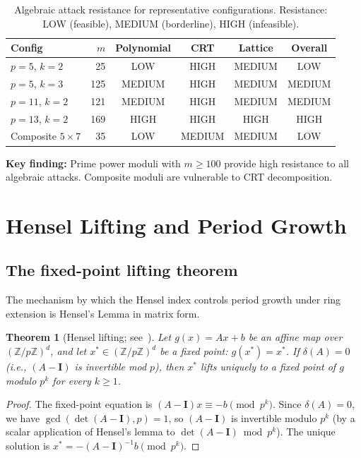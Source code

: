 \documentclass[11pt]{article}
\theoremstyle{plain}
\newtheorem{theorem}{Theorem}[section]
\theoremstyle{definition}
\newcommand{\Z}{\mathbb{Z}}
\newcommand{\Id}{\mathbf{I}}
\begin{document}
\begin{table}[ht]
\centering
\caption{Algebraic attack resistance for representative configurations. Resistance: LOW (feasible), MEDIUM (borderline), HIGH (infeasible).}
\label{tab:algebraic}
\medskip
\begin{tabular}{@{}lrcccc@{}}
\toprule
Config & $m$ & Polynomial & CRT & Lattice & Overall\\
\midrule
$p=5$, $k=2$ & 25 & LOW & HIGH & MEDIUM & LOW\\
$p=5$, $k=3$ & 125 & MEDIUM & HIGH & MEDIUM & MEDIUM\\
$p=11$, $k=2$ & 121 & MEDIUM & HIGH & MEDIUM & MEDIUM\\
$p=13$, $k=2$ & 169 & HIGH & HIGH & HIGH & HIGH\\
Composite $5 \times 7$ & 35 & LOW & MEDIUM & MEDIUM & LOW\\
\bottomrule
\end{tabular}
\end{table}

\textbf{Key finding:} Prime power moduli with $m \geq 100$ provide high resistance to all algebraic attacks. Composite moduli are vulnerable to CRT decomposition.

\section{Hensel Lifting and Period Growth}
\label{sec:hensel}

\subsection{The fixed-point lifting theorem}

The mechanism by which the Hensel index controls period growth under ring extension is Hensel's Lemma in matrix form.

\begin{theorem}[Hensel lifting; see~\citealt{Gouvea1997}]
\label{thm:hensel}
Let $g(x) = Ax + b$ be an affine map over $(\Z/p\Z)^d$, and let $x^* \in (\Z/p\Z)^d$ be a fixed point: $g(x^*) = x^*$. If $\delta(A) = 0$ (i.e., $(A-\Id)$ is invertible mod $p$), then $x^*$ lifts uniquely to a fixed point of $g$ modulo $p^k$ for every $k \geq 1$.
\end{theorem}

\begin{proof}[Proof]
The fixed-point equation is $(A-\Id)x \equiv -b \pmod{p^k}$. Since $\delta(A)=0$, we have $\gcd(\det(A-\Id),p)=1$, so $(A-\Id)$ is invertible modulo $p^k$ (by a scalar application of Hensel's lemma to $\det(A-\Id) \bmod p^k$). The unique solution is $x^* = -(A-\Id)^{-1}b \pmod{p^k}$.
\end{proof}
\end{document}
